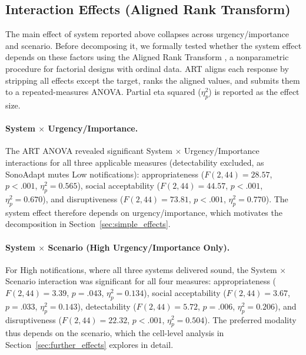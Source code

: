 \subsection{Interaction Effects (Aligned Rank Transform)}
\label{sec:art_interactions}

The main effect of system reported above collapses across urgency/importance and scenario. Before decomposing it, we formally tested whether the system effect depends on these factors using the Aligned Rank Transform \citep[ART;][]{Wobbrock_11_ART}, a nonparametric procedure for factorial designs with ordinal data. ART aligns each response by stripping all effects except the target, ranks the aligned values, and submits them to a repeated-measures ANOVA. Partial eta squared ($\eta^2_p$) is reported as the effect size.

\paragraph{System $\times$ Urgency/Importance.}
The ART ANOVA revealed significant System $\times$ Urgency/Importance interactions for all three applicable measures (detectability excluded, as SonoAdapt mutes Low notifications):
appropriateness ($F(2,44) = 28.57$, $p < .001$, $\eta^2_p = 0.565$),
social acceptability ($F(2,44) = 44.57$, $p < .001$, $\eta^2_p = 0.670$), and
disruptiveness ($F(2,44) = 73.81$, $p < .001$, $\eta^2_p = 0.770$).
The system effect therefore depends on urgency/importance, which motivates the decomposition in Section~\ref{sec:simple_effects}.

\paragraph{System $\times$ Scenario (High Urgency/Importance Only).}
For High notifications, where all three systems delivered sound, the System $\times$ Scenario interaction was significant for all four measures:
appropriateness ($F(2,44) = 3.39$, $p = .043$, $\eta^2_p = 0.134$),
social acceptability ($F(2,44) = 3.67$, $p = .033$, $\eta^2_p = 0.143$),
detectability ($F(2,44) = 5.72$, $p = .006$, $\eta^2_p = 0.206$), and
disruptiveness ($F(2,44) = 22.32$, $p < .001$, $\eta^2_p = 0.504$).
The preferred modality thus depends on the scenario, which the cell-level analysis in Section~\ref{sec:further_effects} explores in detail.